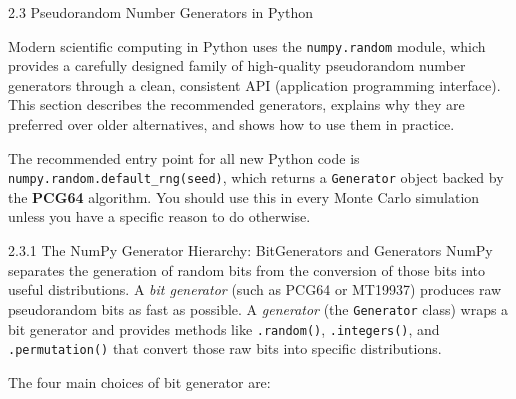 \documentclass[aspectratio=169,10pt]{beamer}
\begin{document}
\begin{frame}[allowframebreaks]{2.3 Pseudorandom Number Generators in Python}

Modern scientific computing in Python uses the \texttt{numpy.random} module,
which provides a carefully designed family of high-quality pseudorandom number
generators through a clean, consistent API (application programming interface).
This section describes the recommended generators, explains why they are
preferred over older alternatives, and shows how to use them in practice.

The recommended entry point for all new Python code is
\texttt{numpy.random.default\_rng(seed)}, which returns a \texttt{Generator}
object backed by the \textbf{PCG64} algorithm.  You should use this in every
Monte Carlo simulation unless you have a specific reason to do otherwise.

\begin{block}{2.3.1 The NumPy Generator Hierarchy: BitGenerators and Generators}
NumPy separates the generation of random bits from the conversion of those
bits into useful distributions.  A \emph{bit generator} (such as PCG64 or
MT19937) produces raw pseudorandom bits as fast as possible.  A \emph{generator}
(the \texttt{Generator} class) wraps a bit generator and provides methods like
\texttt{.random()}, \texttt{.integers()}, and \texttt{.permutation()} that
convert those raw bits into specific distributions.

The four main choices of bit generator are:


\end{block}
\end{frame}
\end{document}
